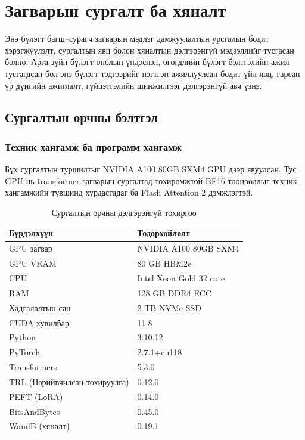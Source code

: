 
\chapter{Загварын сургалт ба хяналт}
\label{Chapter_Training}

Энэ бүлэгт багш--сурагч загварын мэдлэг дамжуулалтын урсгалын бодит хэрэгжүүлэлт, сургалтын явц болон хяналтын дэлгэрэнгүй мэдээллийг тусгасан болно. Арга зүйн бүлэгт онолын үндэслэл, өгөгдлийн бүлэгт бэлтгэлийн ажил тусгагдсан бол энэ бүлэгт тэдгээрийг нэгтгэн ажиллуулсан бодит үйл явц, гарсан үр дүнгийн ажиглалт, гүйцэтгэлийн шинжилгээг дэлгэрэнгүй авч үзнэ.

\section{Сургалтын орчны бэлтгэл}

\subsection{Техник хангамж ба программ хангамж}

Бүх сургалтын туршилтыг NVIDIA A100 80GB SXM4 GPU дээр явуулсан. Тус GPU нь transformer загварын сургалтад тохиромжтой BF16 тооцооллыг техник хангамжийн түвшинд хурдасгадаг ба Flash Attention 2 дэмжлэгтэй.

\begin{table}[htbp]
\centering
\caption{Сургалтын орчны дэлгэрэнгүй тохиргоо}
\label{tab:train_env_full}
\begin{tabular}{ll}
\hline
\textbf{Бүрдэлхүүн} & \textbf{Тодорхойлолт} \\
\hline
GPU загвар              & NVIDIA A100 80GB SXM4 \\
GPU VRAM                & 80 GB HBM2e \\
CPU                     & Intel Xeon Gold 32 core \\
RAM                     & 128 GB DDR4 ECC \\
Хадгалалтын сан         & 2 TB NVMe SSD \\
CUDA хувилбар           & 11.8 \\
Python                  & 3.10.12 \\
PyTorch                 & 2.7.1+cu118 \\
Transformers            & 5.3.0 \\
TRL (Нарийвчилсан тохируулга)       & 0.12.0 \\
PEFT (LoRA)             & 0.14.0 \\
BitsAndBytes            & 0.45.0 \\
WandB (хяналт)          & 0.19.1 \\
\hline
\end{tabular}
\end{table}

